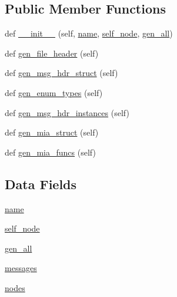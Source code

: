 \subsection*{Public Member Functions}
\begin{DoxyCompactItemize}
\item 
def \hyperlink{classdbc__parse_1_1DBC_a1df573f870c1d3e076871e990bb9f845}{\+\_\+\+\_\+init\+\_\+\+\_\+} (self, \hyperlink{classdbc__parse_1_1DBC_ae3245dbfb7f61ce997c78979f13df924}{name}, \hyperlink{classdbc__parse_1_1DBC_abd457f1296faa1c86877943cc6e57d20}{self\+\_\+node}, \hyperlink{classdbc__parse_1_1DBC_a84e58857a28589687adf4292435a4a00}{gen\+\_\+all})
\item 
def \hyperlink{classdbc__parse_1_1DBC_a05ee51f170a280b78400c6e57117a76c}{gen\+\_\+file\+\_\+header} (self)
\item 
def \hyperlink{classdbc__parse_1_1DBC_ab74fae88905fb58492c5a9acb653a83f}{gen\+\_\+msg\+\_\+hdr\+\_\+struct} (self)
\item 
def \hyperlink{classdbc__parse_1_1DBC_a3217ec2d0eeb36ae12c56c81199c9c4a}{gen\+\_\+enum\+\_\+types} (self)
\item 
def \hyperlink{classdbc__parse_1_1DBC_a15bbf4eae7bec655bd979d5aaca3ba35}{gen\+\_\+msg\+\_\+hdr\+\_\+instances} (self)
\item 
def \hyperlink{classdbc__parse_1_1DBC_a820caf7cfb3a4cb071b83648497879c2}{gen\+\_\+mia\+\_\+struct} (self)
\item 
def \hyperlink{classdbc__parse_1_1DBC_a47cf5fa376ac1dfd6f5a2f1c8c752c6a}{gen\+\_\+mia\+\_\+funcs} (self)
\end{DoxyCompactItemize}
\subsection*{Data Fields}
\begin{DoxyCompactItemize}
\item 
\hyperlink{classdbc__parse_1_1DBC_ae3245dbfb7f61ce997c78979f13df924}{name}
\item 
\hyperlink{classdbc__parse_1_1DBC_abd457f1296faa1c86877943cc6e57d20}{self\+\_\+node}
\item 
\hyperlink{classdbc__parse_1_1DBC_a84e58857a28589687adf4292435a4a00}{gen\+\_\+all}
\item 
\hyperlink{classdbc__parse_1_1DBC_a6c4e80730a556354953e6da7a7bfa878}{messages}
\item 
\hyperlink{classdbc__parse_1_1DBC_a84e171a1b8eb95698e38f0141950b8d6}{nodes}
\end{DoxyCompactItemize}


